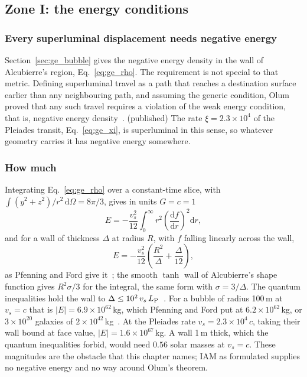 \subsection{Zone I: the energy conditions}\label{sec:pr_energy}

\subsubsection{Every superluminal displacement needs negative energy}
Section~\ref{sec:ge_bubble} gives the negative energy density in the wall of Alcubierre's region, Eq.~\eqref{eq:ge_rho}. The requirement is not
special to that metric. Defining superluminal travel as a path that reaches a destination surface earlier than any neighbouring path, and assuming
the generic condition, Olum proved that any such travel requires a violation of the weak energy condition, that is, negative energy
density~\cite{Olum1998}. \derived{} (published) The rate $\xi=2.3\times10^4$ of the Pleiades transit, Eq.~\eqref{eq:ge_xi}, is superluminal in this
sense, so whatever geometry carries it has negative energy somewhere. \derived

\subsubsection{How much}
Integrating Eq.~\eqref{eq:ge_rho} over a constant-time slice, with $\int(y^2+z^2)/r^2\,\mathrm d\Omega=8\pi/3$, gives in units $G=c=1$
\begin{equation}
E=-\frac{v_s^2}{12}\int_0^\infty r^2\left(\frac{\mathrm df}{\mathrm dr}\right)^2\mathrm dr ,
\label{eq:pr_Etot}
\end{equation}
\derived{} and for a wall of thickness $\Delta$ at radius $R$, with $f$ falling linearly across the wall,
\begin{equation}
E=-\frac{v_s^2}{12}\left(\frac{R^2}{\Delta}+\frac{\Delta}{12}\right) ,
\label{eq:pr_Ewall}
\end{equation}
as Pfenning and Ford give it~\cite{PfenningFord1997}; the smooth $\tanh$ wall of Alcubierre's shape function gives $R^2\sigma/3$ for the integral, the
same form with $\sigma=3/\Delta$. \derived{} The quantum inequalities hold the wall to $\Delta\le10^2\,v_s\,L_{\rm P}$~\cite{PfenningFord1997}.
For a bubble of radius 100\,m at $v_s=c$ that is $|E|=6.9\times10^{62}$\,kg, which Pfenning and Ford put at $6.2\times10^{62}$\,kg, or
$3\times10^{20}$ galaxies of $2\times10^{42}$\,kg~\cite{PfenningFord1997}. \calc{} At the Pleiades rate $v_s=2.3\times10^4\,c$, taking their wall
bound at face value, $|E|=1.6\times10^{67}$\,kg. \calc{} A wall 1\,m thick, which the quantum inequalities forbid, would need $0.56$ solar masses at
$v_s=c$. \calc{} These magnitudes are the obstacle that this chapter names; IAM as formulated supplies no negative energy and no way
around Olum's theorem. \derived

